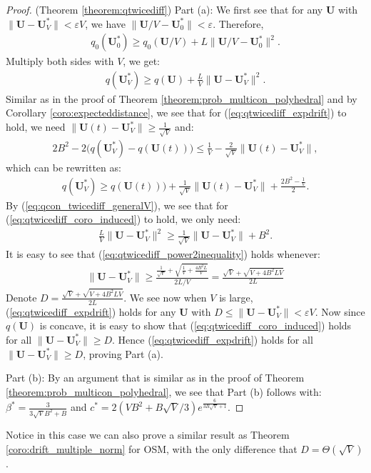 \documentclass[journal]{IEEEtran}
\newcommand{\bv}[1]{{\boldsymbol{#1} }}
\begin{document}
\begin{proof} (Theorem \ref{theorem:qtwicediff})
Part (a): We first see that for any $\bv{U}$ with  $\|\bv{U}-\bv{U}_V^*\|< \varepsilon V$, we have $\|\bv{U}/V-\bv{U}_0^*\|< \varepsilon$. Therefore, 
\begin{eqnarray}
q_0(\bv{U}^*_0)\geq q_0(\bv{U}/V)+L\|\bv{U}/V-\bv{U}_0^*\|^2.
\end{eqnarray}
Multiply both sides with $V$, we get:
\begin{eqnarray}
q(\bv{U}^*_V)\geq q(\bv{U})+\frac{L}{V}\|\bv{U}-\bv{U}_V^*\|^2.\label{eq:qcon_twicediff_generalV}
\end{eqnarray}
Similar as in the proof of Theorem \ref{theorem:prob_multicon_polyhedral} and by Corollary \ref{coro:expecteddistance}, we see that for (\ref{eq:qtwicediff_expdrift}) to hold, we need $\|\bv{U}(t)-\bv{U}^*_V\|\geq\frac{1}{\sqrt{V}}$ and:
\begin{eqnarray*}
2B^2-2\big(q(\bv{U}^*_V)-q(\bv{U}(t))\big)\leq \frac{1}{V}-\frac{2}{\sqrt{V}}\|\bv{U}(t)-\bv{U}^*_V\|, 
\end{eqnarray*}
which can be rewritten as: 
\begin{eqnarray}
q(\bv{U}^*_V)\geq q(\bv{U}(t))\big)+\frac{1}{\sqrt{V}}\|\bv{U}(t)-\bv{U}^*_V\|+\frac{2B^2-\frac{1}{V}}{2}.\label{eq:qtwicediff_coro_induced}
\end{eqnarray}
By (\ref{eq:qcon_twicediff_generalV}), we see that for (\ref{eq:qtwicediff_coro_induced}) to hold, we only need:
\begin{eqnarray}
\frac{L}{V}\|\bv{U}-\bv{U}_V^*\|^2\geq \frac{1}{\sqrt{V}} \|\bv{U}-\bv{U}_V^*\| +B^2.\label{eq:qtwicediff_power2inequality}
\end{eqnarray}
It is easy to see that (\ref{eq:qtwicediff_power2inequality}) holds whenever:
\begin{eqnarray*}
\|\bv{U}-\bv{U}_V^*\|\geq \frac{\frac{1}{\sqrt{V}}+\sqrt{\frac{1}{V}+ \frac{4B^2L}{V}} }{2L/V} = \frac{\sqrt{V}+\sqrt{V+ 4B^2LV} }{2L}
\end{eqnarray*}
Denote $D=\frac{\sqrt{V}+\sqrt{V+ 4B^2LV} }{2L}$. We see now when $V$ is large, (\ref{eq:qtwicediff_expdrift}) holds for any $\bv{U}$ with $D\leq\|\bv{U}-\bv{U}_V^*\|<\varepsilon V$. Now since $q(\bv{U})$ is concave, it is easy to show that (\ref{eq:qtwicediff_coro_induced}) holds for all $\|\bv{U}-\bv{U}_V^*\|\geq D$. Hence (\ref{eq:qtwicediff_expdrift}) holds for all $\|\bv{U}-\bv{U}_V^*\|\geq D$, proving Part (a). 

Part (b): By an argument that is similar as in the proof of Theorem \ref{theorem:prob_multicon_polyhedral}, we see that Part (b) follows with:
$\beta^*=\frac{3}{3\sqrt{V}B^2+B}$ and $ c^*=2(VB^2+B\sqrt{V}/3)e^{\frac{6}{3B\sqrt{V}+1}}$.
\end{proof}
Notice in this case we can also prove a similar result as Theorem \ref{coro:drift_multiple_norm} for OSM, with the only difference that $D=\Theta(\sqrt{V})$.
\end{document}
